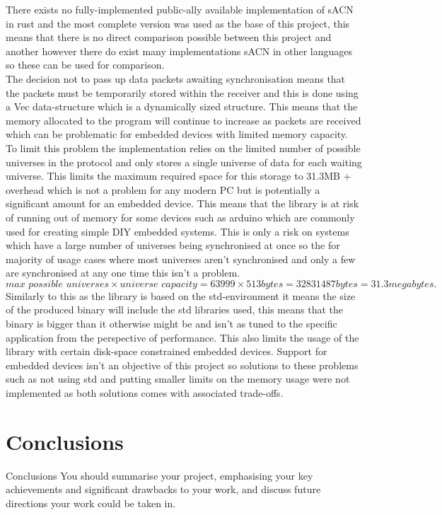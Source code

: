 \documentclass[11pt,a4paper]{report}
\begin{document}
	There exists no fully-implemented public-ally available implementation of sACN in rust and the most complete version was used as the base of this project, this means that there is no direct comparison possible between this project and another however there do exist many implementations sACN in other languages so these can be used for comparison. \\
	
	
	The decision not to pass up data packets awaiting synchronisation means that the packets must be temporarily stored within the receiver and this is done using a Vec data-structure which is a dynamically sized structure. This means that the memory allocated to the program will continue to increase as packets are received which can be problematic for embedded devices with limited memory capacity. To limit this problem the implementation relies on the limited number of possible universes in the protocol and only stores a single universe of data for each waiting universe. This limits the maximum required space for this storage to 31.3MB + overhead which is not a problem for any modern PC but is potentially a significant amount for an embedded device. This means that the library is at risk of running out of memory for some devices such as arduino \cite{ARDUINO} which are commonly used for creating simple DIY embedded systems. This is only a risk on systems which have a large number of universes being synchronised at once so the for majority of usage cases where most universes aren't synchronised and only a few are synchronised at any one time this isn't a problem.
	\[ 
	\textit{max possible universes} \times \textit{universe capacity} = 63999 \times 513 bytes = 32831487 bytes = 31.3 megabytes. 
	\]
	Similarly to this as the library is based on the std-environment it means the size of the produced binary will include the std libraries used, this means that the binary is bigger than it otherwise might be and isn't as tuned to the specific application from the perspective of performance. This also limits the usage of the library with certain disk-space constrained embedded devices. Support for embedded devices isn't an objective of this project so solutions to these problems such as not using std and putting smaller limits on the memory usage were not implemented as both solutions comes with associated trade-offs.
	
	\section{Conclusions}
	Conclusions
	You should summarise your project, emphasising your
	key achievements and significant drawbacks to your
	work, and discuss future directions your work could be
	taken in.
	
\end{document}
